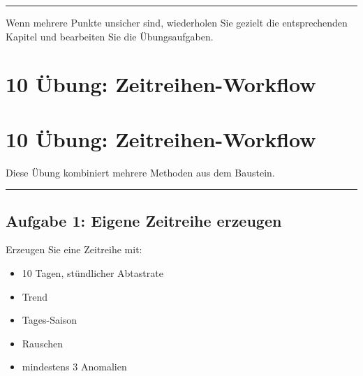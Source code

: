 \documentclass[
  ngerman,
  letterpaper,
  DIV=11]{scrreprt}
\providecommand{\tightlist}{%
  \setlength{\itemsep}{0pt}\setlength{\parskip}{0pt}}
\begin{document}
\begin{center}\rule{0.5\linewidth}{0.5pt}\end{center}

\begin{tcolorbox}[enhanced jigsaw, titlerule=0mm, title=\textcolor{quarto-callout-tip-color}{\faLightbulb}\hspace{0.5em}{Hinweis}, bottomrule=.15mm, opacityback=0, colbacktitle=quarto-callout-tip-color!10!white, coltitle=black, opacitybacktitle=0.6, colframe=quarto-callout-tip-color-frame, toprule=.15mm, leftrule=.75mm, arc=.35mm, rightrule=.15mm, breakable, bottomtitle=1mm, colback=white, toptitle=1mm, left=2mm]

Wenn mehrere Punkte unsicher sind, wiederholen Sie gezielt die
entsprechenden Kapitel und bearbeiten Sie die Übungsaufgaben.

\end{tcolorbox}


\chapter{10 Übung:
Zeitreihen-Workflow}\label{uxfcbung-zeitreihen-workflow}


\chapter{10 Übung:
Zeitreihen-Workflow}\label{uxfcbung-zeitreihen-workflow-1}

Diese Übung kombiniert mehrere Methoden aus dem Baustein.

\begin{center}\rule{0.5\linewidth}{0.5pt}\end{center}

\section{Aufgabe 1: Eigene Zeitreihe
erzeugen}\label{aufgabe-1-eigene-zeitreihe-erzeugen}

Erzeugen Sie eine Zeitreihe mit:

\begin{itemize}
\tightlist
\item
  10 Tagen, stündlicher Abtastrate
\item
  Trend
\item
  Tages-Saison
\item
  Rauschen
\item
  mindestens 3 Anomalien
\end{itemize}
\end{document}
